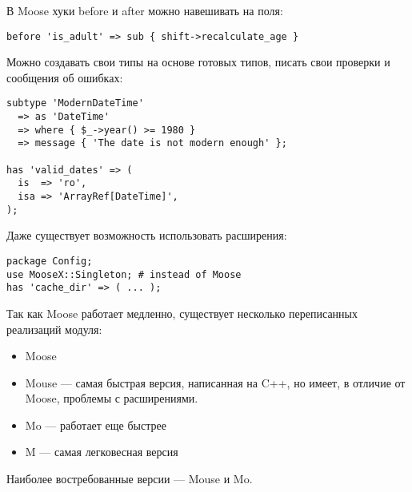 В Moose хуки before и after можно навешивать на поля:
\begin{verbatim}
before 'is_adult' => sub { shift->recalculate_age }
\end{verbatim}
Можно создавать свои типы на основе готовых типов, писать свои проверки и сообщения об ошибках:
\begin{verbatim}
subtype 'ModernDateTime'
  => as 'DateTime'
  => where { $_->year() >= 1980 }
  => message { 'The date is not modern enough' };

has 'valid_dates' => (
  is  => 'ro',
  isa => 'ArrayRef[DateTime]',
);
\end{verbatim}
Даже существует возможность использовать расширения:
\begin{verbatim}
package Config;
use MooseX::Singleton; # instead of Moose
has 'cache_dir' => ( ... );
\end{verbatim}

Так как Moose работает медленно, существует несколько переписанных реализаций модуля:
\begin{itemize}
	\item Moose
	\item Mouse --- самая быстрая версия, написанная на C++, но имеет, в отличие от Moose, проблемы с расширениями.
	\item Mo --- работает еще быстрее
	\item M --- самая легковесная версия
\end{itemize}
Наиболее востребованные версии --- Mouse и Mo.
